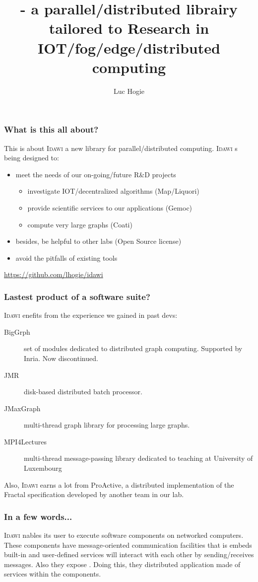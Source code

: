 \documentclass[11pt]{beamer}
\author{Luc Hogie}
\title{\idawi - a parallel/distributed librairy tailored to Research in IOT/fog/edge/distributed computing}
\institute{Cnrs/Inria/Université Côte d'Azur}
\newcommand{\idawi}[1]{\textsc{Idawi}\xspace}
\begin{document}
\begin{frame}
\titlepage
\end{frame}



\begin{frame}
\frametitle{What is this all about?}
This is about \idawi, a new library for parallel/distributed computing.
\idawi is being designed to:
\begin{itemize}
	\item meet the needs of our on-going/future R\&D projects
		\begin{itemize}
			\item investigate IOT/decentralized algorithms (Map/Liquori)
			\item provide scientific services to our applications (Gemoc)
			\item compute very large graphs (Coati)
		\end{itemize}
	\item besides, be helpful to other labs (Open Source license)
	\item avoid the pitfalls of existing tools
\end{itemize}
\url{https://github.com/lhogie/idawi}
\end{frame}


\begin{frame}
\frametitle{Lastest product of a software suite?}
\idawi benefits from the experience we gained in past devs:
\begin{description}
	\item[BigGrph] set of modules dedicated to distributed graph computing. Supported by Inria. Now discontinued.
	\item[JMR] disk-based distributed batch processor.
	\item[JMaxGraph] multi-thread graph library for   processing large graphs.
	\item[MPI4Lectures]multi-thread message-passing library dedicated to teaching at University of Luxembourg
\end{description}
Also, \idawi learns a lot from ProActive,  a distributed implementation of the Fractal specification  developed by another team in our lab.
\end{frame}


\begin{frame}
\frametitle{In a few words...}
\idawi enables its user to execute software components on networked computers. These components have message-oriented communication facilities that is embeds built-in and user-defined services   will interact with each other by sending/receives messages. Also they expose . Doing this, they  distributed application made of services within the components.
\end{frame}
\end{document}
